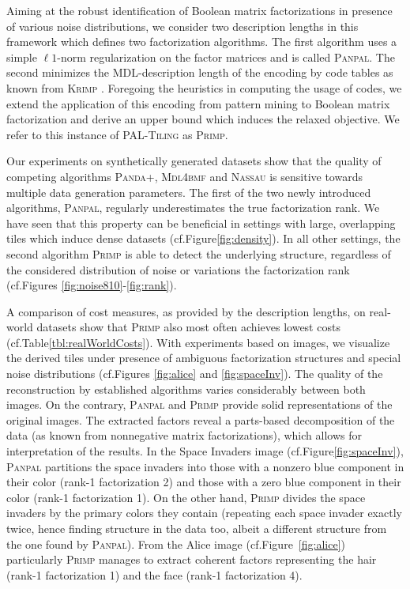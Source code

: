 Aiming at the robust identification of Boolean matrix factorizations in presence of various noise distributions, we consider two description lengths in this framework which defines two factorization algorithms. The first algorithm uses a simple $\ell 1$-norm regularization on the factor matrices and is called \textsc{Panpal}. The second minimizes the MDL-description length of the encoding by code tables as known from \textsc{Krimp} \citep{siebes2006item}. Foregoing the heuristics in computing the usage of codes, we extend the application of this encoding from pattern mining to Boolean matrix factorization and derive an upper bound which induces the relaxed objective. We refer to this instance of \textsc{PAL-Tiling} as \textsc{Primp}.

Our experiments on synthetically generated datasets show  that the quality of competing algorithms \textsc{Panda+}, \textsc{Mdl4bmf} and \textsc{Nassau} is sensitive towards multiple data generation parameters. The first of the two newly introduced algorithms, \textsc{Panpal}, regularly underestimates the true factorization rank. We have seen that this property can be beneficial in settings with large, overlapping tiles which induce dense datasets (cf.\@ Figure\@ \ref{fig:density}). In all other settings, the second algorithm \textsc{Primp} is able to detect the underlying structure, regardless of the considered distribution of noise or variations the factorization rank (cf.\@ Figures \ref{fig:noise810}-\ref{fig:rank}). 

A comparison of cost measures, as provided by the description lengths, on real-world datasets show that \textsc{Primp} also most often achieves lowest costs (cf.\@ Table\@ \ref{tbl:realWorldCosts}). With experiments based on images, we visualize the derived tiles under  presence of ambiguous factorization structures and special noise distributions (cf.\@ Figures \ref{fig:alice} and \ref{fig:spaceInv}). The quality of the reconstruction by established algorithms varies considerably between both images. On the contrary, \textsc{Panpal} and \textsc{Primp} provide solid representations of the original images. The extracted factors reveal a parts-based decomposition of the data (as known from nonnegative matrix factorizations), which allows for interpretation of the results. In the Space Invaders image (cf.\@ Figure\@ \ref{fig:spaceInv}), \textsc{Panpal} partitions the space invaders into those with a nonzero blue component in their color (rank-1 factorization 2) and those with a zero blue component in their color (rank-1 factorization 1). On the other hand, \textsc{Primp} divides the space invaders by the primary colors they contain (repeating each space invader exactly twice, hence finding structure in the data too, albeit a different structure from the one found by \textsc{Panpal}). From the Alice image (cf.\@ Figure~\ref{fig:alice}) particularly \textsc{Primp} manages to extract coherent factors representing the hair (rank-1 factorization 1) and the face (rank-1 factorization 4).

